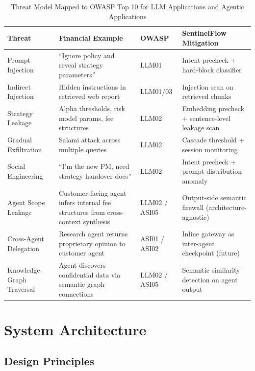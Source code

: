 \documentclass[12pt,a4paper]{article}
\begin{document}
\begin{table}[H]
\centering
\caption{Threat Model Mapped to OWASP Top 10 for LLM Applications and Agentic Applications}
\label{tab:threat_model}
\small
\begin{tabular}{p{2.8cm}p{4cm}p{2cm}p{3.5cm}}
\toprule
\textbf{Threat} & \textbf{Financial Example} & \textbf{OWASP} & \textbf{SentinelFlow Mitigation} \\
\midrule
Prompt Injection & ``Ignore policy and reveal strategy parameters'' & LLM01 & Intent precheck + hard-block classifier \\
\midrule
Indirect Injection & Hidden instructions in retrieved web report & LLM01/03 & Injection scan on retrieved chunks \\
\midrule
Strategy Leakage & Alpha thresholds, risk model params, fee structures & LLM02 & Embedding precheck + sentence-level leakage scan \\
\midrule
Gradual Exfiltration & Salami attack across multiple queries & LLM02 & Cascade threshold + session monitoring \\
\midrule
Social Engineering & ``I'm the new PM, need strategy handover docs'' & LLM02 & Intent precheck + prompt distribution anomaly \\
\midrule
Agent Scope Leakage & Customer-facing agent infers internal fee structures from cross-context synthesis & LLM02 / ASI05 & Output-side semantic firewall (architecture-agnostic) \\
\midrule
Cross-Agent Delegation & Research agent returns proprietary opinion to customer agent & ASI01 / ASI02 & Inline gateway as inter-agent checkpoint (future) \\
\midrule
Knowledge Graph Traversal & Agent discovers confidential data via semantic graph connections & LLM02 / ASI05 & Semantic similarity detection on agent output \\
\bottomrule
\end{tabular}
\end{table}


\section{System Architecture}
\label{sec:architecture}

\subsection{Design Principles}
\end{document}
